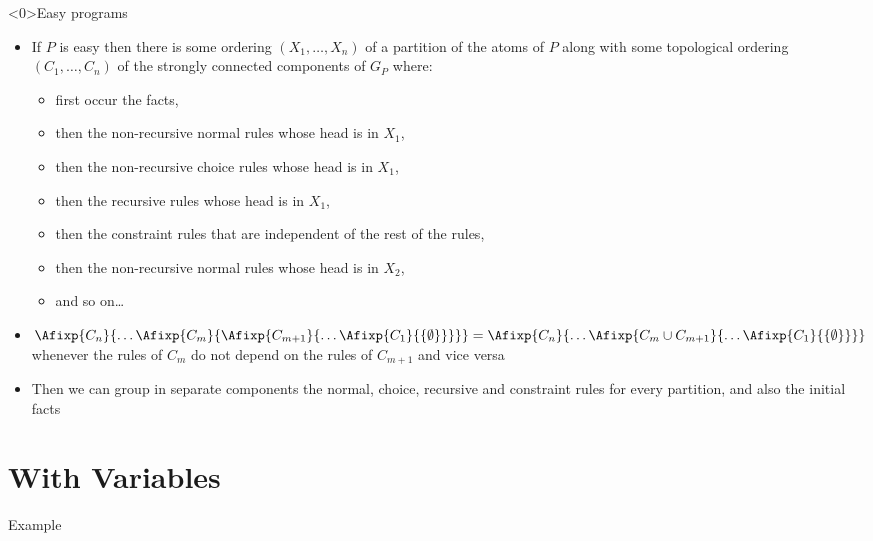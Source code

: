 \begin{frame}<0>{Easy programs}
  \begin{itemize}
    \item If $P$ is easy then there is 
          some ordering $(X_1, \ldots, X_n)$ of a partition of the atoms of $P$ along with
          some topological ordering
          $(C_1, \ldots, C_n)$ of the strongly connected components of $G_P$
          where:
    \begin{itemize}
      \item first occur the facts, 
      \item then the non-recursive normal rules whose head is in $X_1$, 
      \item then the non-recursive choice rules whose head is in $X_1$, 
      \item then the recursive rules whose head is in $X_1$, 
      \item then the constraint rules that are independent of the rest of the rules,
      \item then the non-recursive normal rules whose head is in $X_2$, 
      \item and so on\ldots
    \end{itemize}
      \item $\Afixp{C_n}{\ldots\Afixp{C_m}{\Afixp{C_{m+1}}{\ldots\Afixp{C_1}{\{\emptyset\}}}}} =
             \Afixp{C_n}{\ldots\Afixp{C_m \cup C_{m+1}}{\ldots\Afixp{C_1}{\{\emptyset\}}}}$ whenever 
            the rules of $C_m$ do not depend on the rules of $C_{m+1}$ and vice versa
    \item Then we can group in separate components
          the normal, choice, recursive  and constraint rules for every partition, and also the initial facts
  \end{itemize}
\end{frame}

\section{With Variables}

\begin{frame}{Example}
\xtodo
\end{frame}

